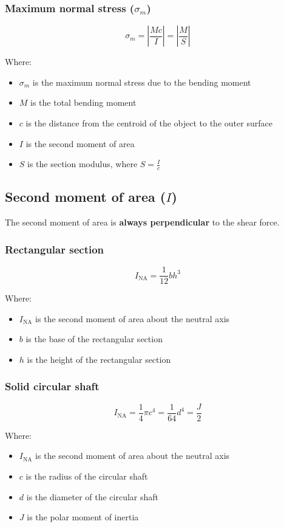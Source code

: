 \documentclass[11pt]{article}
\begin{document}
\newpage

\subsubsection{Maximum normal stress (\(\sigma_m\))}
\label{sec:org358dc91}
\[\sigma_m = \left| \frac{Mc}{I} \right| = \left| \frac{M}{S} \right|\]

Where:
\begin{itemize}
\item \(\sigma_m\) is the maximum normal stress due to the bending moment
\item \(M\) is the total bending moment
\item \(c\) is the distance from the centroid of the object to the outer surface
\item \(I\) is the second moment of area
\item \(S\) is the section modulus, where \(S = \frac{I}{c}\)
\end{itemize}

\subsection{Second moment of area (\(I\))}
\label{sec:org109d100}
The second moment of area is \textbf{always perpendicular} to the shear force.

\subsubsection{Rectangular section}
\label{sec:org2aad64f}
\[I_{\text{NA}} = \frac{1}{12} bh^3\]

Where:
\begin{itemize}
\item \(I_{\text{NA}}\) is the second moment of area about the neutral axis
\item \(b\) is the base of the rectangular section
\item \(h\) is the height of the rectangular section
\end{itemize}

\subsubsection{Solid circular shaft}
\label{sec:orgb73d149}
\[I_{\text{NA}} = \frac{1}{4}\pi c^4 = \frac{1}{64}d^4 = \frac{J}{2}\]

Where:
\begin{itemize}
\item \(I_{\text{NA}}\) is the second moment of area about the neutral axis
\item \(c\) is the radius of the circular shaft
\item \(d\) is the diameter of the circular shaft
\item \(J\) is the polar moment of inertia
\end{itemize}
\end{document}
